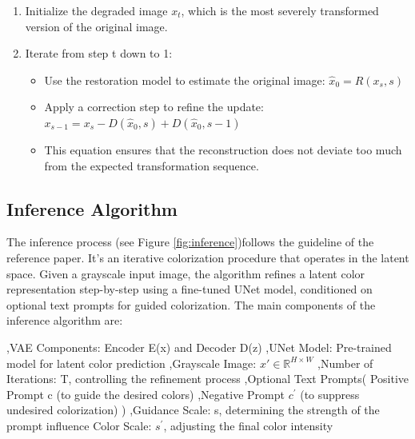 \documentclass[10pt,twocolumn,letterpaper]{article}
\begin{document}
\begin{enumerate}
\item Initialize the degraded image $x_t $, which is the most severely transformed version of the original image.
\item Iterate from step t down to 1:
\begin{itemize}
\item Use the restoration model to estimate the original image: $ \hat{x}_0 = R(x_s, s) $
\item Apply a correction step to refine the update: \begin{math} x_{s-1} = x_s - D(\hat{x}_0, s) + D(\hat{x}_0, s-1) \end{math} 
\item This equation ensures that the reconstruction does not deviate too much from the expected transformation sequence.

\end{itemize}

\end{enumerate}

\subsection{Inference Algorithm}
The inference process (see Figure \ref{fig:inference})follows the guideline of the reference paper. It’s an iterative colorization procedure that operates in the latent space. Given a grayscale input image, the algorithm refines a latent color representation step-by-step using a fine-tuned UNet model, conditioned on optional text prompts for guided colorization.
The main components of the inference algorithm are:

,VAE Components: Encoder E(x) and Decoder D(z)
,UNet Model: Pre-trained model for latent color prediction
,Grayscale Image: \begin{math}x' \in \mathbb{R}^{H \times W}\end{math}
,Number of Iterations: T, controlling the refinement process
,Optional Text Prompts(
	Positive Prompt c (to guide the desired colors)
	,Negative Prompt $c^{\prime} $ (to suppress undesired colorization)
)
,Guidance Scale: s, determining the strength of the prompt influence
Color Scale: $s^{\prime} $, adjusting the final color intensity
\end{document}
